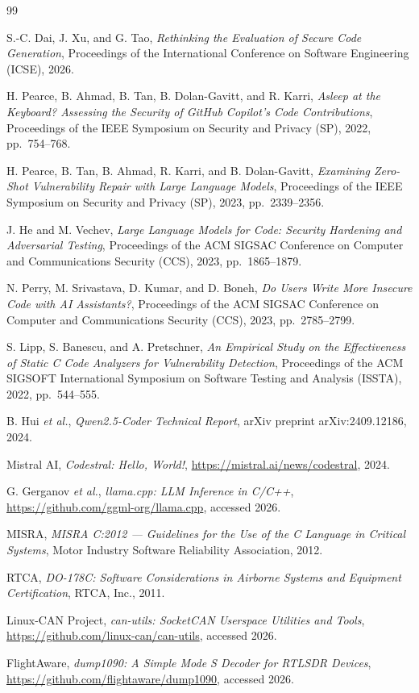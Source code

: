 \documentclass[12pt]{article}
\begin{document}
\begin{thebibliography}{99}

S.-C. Dai, J. Xu, and G. Tao,
\emph{Rethinking the Evaluation of Secure Code Generation},
Proceedings of the International Conference on Software Engineering (ICSE), 2026.

H. Pearce, B. Ahmad, B. Tan, B. Dolan-Gavitt, and R. Karri,
\emph{Asleep at the Keyboard? Assessing the Security of GitHub Copilot's Code Contributions},
Proceedings of the IEEE Symposium on Security and Privacy (SP), 2022, pp.~754--768.

H. Pearce, B. Tan, B. Ahmad, R. Karri, and B. Dolan-Gavitt,
\emph{Examining Zero-Shot Vulnerability Repair with Large Language Models},
Proceedings of the IEEE Symposium on Security and Privacy (SP), 2023, pp.~2339--2356.

J. He and M. Vechev,
\emph{Large Language Models for Code: Security Hardening and Adversarial Testing},
Proceedings of the ACM SIGSAC Conference on Computer and Communications Security (CCS), 2023, pp.~1865--1879.

N. Perry, M. Srivastava, D. Kumar, and D. Boneh,
\emph{Do Users Write More Insecure Code with AI Assistants?},
Proceedings of the ACM SIGSAC Conference on Computer and Communications Security (CCS), 2023, pp.~2785--2799.

S. Lipp, S. Banescu, and A. Pretschner,
\emph{An Empirical Study on the Effectiveness of Static C Code Analyzers for Vulnerability Detection},
Proceedings of the ACM SIGSOFT International Symposium on Software Testing and Analysis (ISSTA), 2022, pp.~544--555.

B. Hui \emph{et al.},
\emph{Qwen2.5-Coder Technical Report},
arXiv preprint arXiv:2409.12186, 2024.

Mistral AI,
\emph{Codestral: Hello, World!},
\url{https://mistral.ai/news/codestral}, 2024.

G. Gerganov \emph{et al.},
\emph{llama.cpp: LLM Inference in C/C++},
\url{https://github.com/ggml-org/llama.cpp}, accessed 2026.

MISRA,
\emph{MISRA C:2012 --- Guidelines for the Use of the C Language in Critical Systems},
Motor Industry Software Reliability Association, 2012.

RTCA,
\emph{DO-178C: Software Considerations in Airborne Systems and Equipment Certification},
RTCA, Inc., 2011.

Linux-CAN Project,
\emph{can-utils: SocketCAN Userspace Utilities and Tools},
\url{https://github.com/linux-can/can-utils}, accessed 2026.

FlightAware,
\emph{dump1090: A Simple Mode S Decoder for RTLSDR Devices},
\url{https://github.com/flightaware/dump1090}, accessed 2026.

\end{thebibliography}
\end{document}
